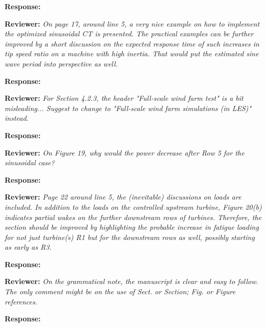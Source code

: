 \documentclass[]{article}
\begin{document}
\textbf{Response: }

\dotfill

\textbf{Reviewer: } \textit{On page 17, around line 5, a very nice example on how to implement the optimized
	sinusoidal CT is presented. The practical examples can be further improved by a
	short discussion on the expected response time of such increases in tip speed ratio
	on a machine with high inertia. That would put the estimated sine wave period into
	perspective as well.}

\textbf{Response: }

\dotfill

\textbf{Reviewer: } \textit{For Section 4.2.3, the header "Full-scale wind farm test" is a bit misleading... Suggest
	to change to "Full-scale wind farm simulations (in LES)" instead.}

\textbf{Response: }

\dotfill

\textbf{Reviewer: } \textit{On Figure 19, why would the power decrease after Row 5 for the sinusoidal case?}

\textbf{Response: }

\dotfill

\textbf{Reviewer: } \textit{Page 22 around line 5, the (inevitable) discussions on loads are included. In addition
	to the loads on the controlled upstream turbine, Figure 20(b) indicates partial wakes
	on the further downstream rows of turbines. Therefore, the section should be improved
	by highlighting the probable increase in fatigue loading for not just turbine(s) R1 but for
	the downstream rows as well, possibly starting as early as R3.}

\textbf{Response: }

\dotfill

\textbf{Reviewer: } \textit{On the grammatical note, the manuscript is clear and easy to follow. The only comment
	might be on the use of Sect. or Section; Fig. or Figure references.}

\textbf{Response: }
\end{document}
